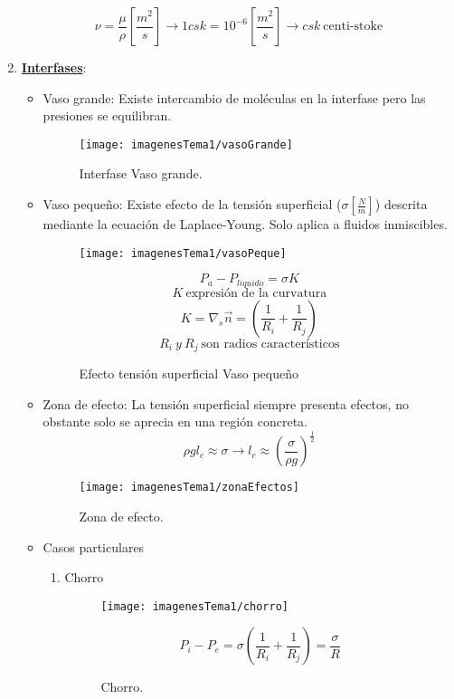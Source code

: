\begin{enumerate}
	\[\nu = \frac{\mu}{\rho} \left[\frac{m^2}{s}\right] \rightarrow 1 csk = 10^{-6}\left[\frac{m^2}{s}\right] \rightarrow csk \ \text{centi-stoke}\]
	
	\item \underline{\textbf{Interfases}}: 
	\begin{itemize}
		\item Vaso grande: Existe intercambio de moléculas en la interfase pero las presiones se equilibran.
		 \begin{figure}[H]
		 	\centering
		 	\texttt{[image: imagenesTema1/vasoGrande]}
		 	\caption{Interfase Vaso grande.}
		 	\label{fig:vasogrande}
		 \end{figure}
		 
		\item Vaso pequeño: Existe efecto de la tensión superficial ($\sigma \left[
		\frac{N}{m}\right]$) descrita mediante la ecuación de Laplace-Young. Solo aplica a fluidos inmiscibles. 
		\begin{figure}[H]
			\begin{minipage}{0.7\textwidth}
				\centering
				\texttt{[image: imagenesTema1/vasoPeque]}
				\caption{Efecto tensión superficial Vaso pequeño}
				\label{fig:vasopeque}
			\end{minipage}%
			\begin{minipage}{0.3\textwidth}
				\[P_a - P_{liquido}=\sigma K\]
			\[K \ \text{expresión de la curvatura}\]
			\[K=\nabla_s \vec{n} = \left(\frac{1}{R_i}+\frac{1}{R_j}\right) \]
			\[R_i \ y \  R_j \ \text{son radios característicos}\]
			
			\end{minipage}
		\end{figure}

		\item Zona de efecto: La tensión superficial siempre presenta efectos, no obstante solo se aprecia en una región concreta.
		\[\rho g l_c \approx \sigma \rightarrow l_c \approx \left(\frac{\sigma}{\rho g}\right)^{\frac{1}{2}}\]
		
		\begin{figure}[H]
			\centering
			\texttt{[image: imagenesTema1/zonaEfectos]}
			\caption{Zona de efecto.}
			\label{fig:zonaefectos}
		\end{figure}
		
		\item Casos particulares
		\begin{enumerate}
			\item Chorro
			\begin{figure}[H]
				\begin{minipage}{0.4\textwidth}
				\centering
				\texttt{[image: imagenesTema1/chorro]}
				\caption{Chorro.}
				\label{fig:chorro}
			\end{minipage}%
			\begin{minipage}{0.3\textwidth}
			\[P_i - P_e =\sigma\left(\frac{1}{R_i}+\frac{1}{R_j}\right)=\frac{\sigma}{R}\]
			

\end{minipage}
\end{figure}
\end{enumerate}
\end{itemize}
\end{enumerate}
